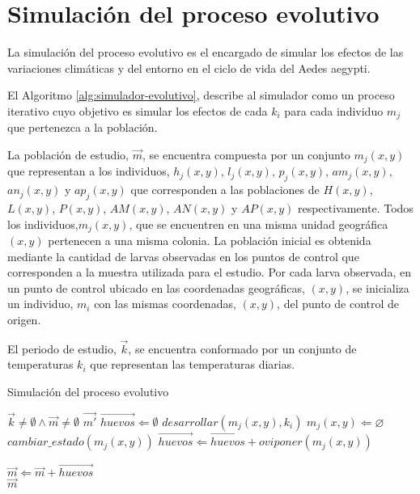 
\section{Simulación del proceso evolutivo}
La simulación del proceso evolutivo es el encargado de simular los efectos de las variaciones
climáticas y del entorno en el ciclo de vida del Aedes aegypti.

El Algoritmo \ref{alg:simulador-evolutivo}, describe al simulador como un proceso iterativo cuyo
objetivo es simular los efectos de cada $k_{i}$ para cada individuo $m_{j}$ que pertenezca a la
población.

La población de estudio, $\vec{m}$, se encuentra compuesta por un conjunto $m_{j}(x, y)$ que
representan a los individuos, $h_{j}(x, y)$, $l_{j}(x, y)$, $p_{j}(x, y)$, $am_{j}(x, y)$,
$an_{j}(x, y)$ y $ap_{j}(x, y)$ que corresponden a las poblaciones de $H(x,y)$, $L(x,y)$, $P(x,y)$,
$AM(x, y)$, $AN(x, y)$ y $AP(x, y)$ respectivamente. Todos los individuos,$m_{j}(x, y)$, que se
encuentren en una misma unidad geográfica $(x, y)$ pertenecen a una misma colonia. La población
inicial es obtenida mediante la cantidad de larvas observadas en los puntos de control que
corresponden a la muestra utilizada para el estudio. Por cada larva observada, en un punto de
control ubicado en las coordenadas geográficas, $(x, y)$, se inicializa un individuo, $m_{i}$ con
las mismas coordenadas, $(x, y)$, del punto de control de origen.

El periodo de estudio, $\vec{k}$, se encuentra conformado por un conjunto de temperaturas $k_{i}$
que representan las temperaturas diarias.

\begin{algorithm}
\caption{Simulación del proceso evolutivo \label{alg:simulador-evolutivo}}
\begin{algorithmic}[1]
    \Require $\vec{k}\neq \emptyset \land \vec{m} \neq \emptyset$
    \Ensure $\vec{m'}$
        \State $\vec{huevos} \Leftarrow \emptyset$
            \State $desarrollar(m_{j}(x, y), k_{i})$
                \State {}
                \State $m_{j}(x, y) \Leftarrow \varnothing $
                \State $ cambiar\_estado(m_{j}(x, y)) $
                \State $\vec{huevos} \Leftarrow \vec{huevos} + oviponer(m_{j}(x, y))$
            \EndIf
        \EndFor

            \State {}
            \State $\vec{m} \Leftarrow  \vec{m} + \vec{huevos}$
        \EndIf
    \EndFor \\
    \Return $\vec{m}$
\end{algorithmic}
\end{algorithm}


